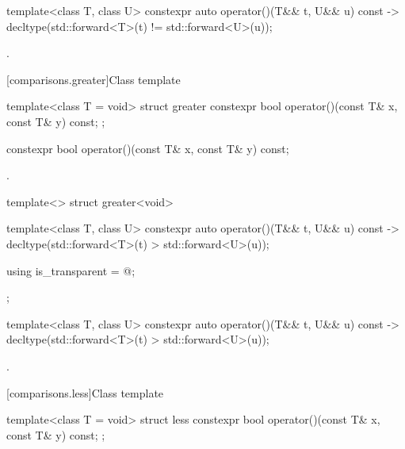 %
\begin{itemdecl}
template<class T, class U> constexpr auto operator()(T&& t, U&& u) const
    -> decltype(std::forward<T>(t) != std::forward<U>(u));
\end{itemdecl}

\begin{itemdescr}
\pnum
\returns
{}.
\end{itemdescr}

[comparisons.greater]{Class template }

%
\begin{itemdecl}
template<class T = void> struct greater {
  constexpr bool operator()(const T& x, const T& y) const;
};
\end{itemdecl}

%
\begin{itemdecl}
constexpr bool operator()(const T& x, const T& y) const;
\end{itemdecl}

\begin{itemdescr}
\pnum
\returns
{}.
\end{itemdescr}

%
\begin{itemdecl}
template<> struct greater<void> {
  template<class T, class U> constexpr auto operator()(T&& t, U&& u) const
    -> decltype(std::forward<T>(t) > std::forward<U>(u));

  using is_transparent = @\unspec@;
};
\end{itemdecl}

%
\begin{itemdecl}
template<class T, class U> constexpr auto operator()(T&& t, U&& u) const
    -> decltype(std::forward<T>(t) > std::forward<U>(u));
\end{itemdecl}

\begin{itemdescr}
\pnum
\returns
{}.
\end{itemdescr}

[comparisons.less]{Class template }

%
\begin{itemdecl}
template<class T = void> struct less {
  constexpr bool operator()(const T& x, const T& y) const;
};
\end{itemdecl}

